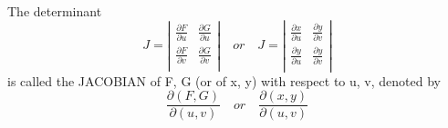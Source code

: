 \documentclass[11pt]{amsbook}
\begin{document}
    \\The determinant
    \[J = \left| \begin{array}{cc}
        \frac{\partial F}{\partial u} & \frac{\partial G}{\partial u}\\[0.5em]
        \frac{\partial F}{\partial v} & \frac{\partial G}{\partial v}\\ \end{array} \right| \quad or \quad J = \left| \begin{array}{cc}
        \frac{\partial x}{\partial u} & \frac{\partial y}{\partial v}\\[0.5em]
        \frac{\partial y}{\partial u} & \frac{\partial y}{\partial v}\\ \end{array} \right|\]
    is called the JACOBIAN of F, G (or of x, y) with respect to u, v, denoted by
    \[
        \frac{\partial (F, G)}{\partial (u,v)} \quad or \quad \frac{\partial (x, y)}{\partial (u,v)} \]
\end{document}
